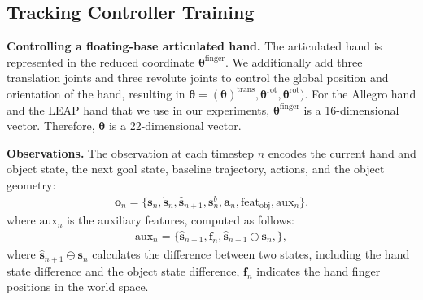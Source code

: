 \subsection{Tracking Controller Training} \label{sec:supp_method_tracking_controller_train}




\noindent\textbf{Controlling a floating-base articulated hand.} The articulated hand is represented in the reduced coordinate $\mathbf{\theta}^{\text{finger}}$. We additionally add three translation joints and three revolute joints to control the global position and orientation of the hand, resulting in $\mathbf{\theta} = (\mathbf{\theta})^{\text{trans}}, \mathbf{\theta}^{\text{rot}}, \mathbf{\theta}^{\text{rot}})$. For the Allegro hand and the LEAP hand that we use in our experiments, $\mathbf{\theta}^{\text{finger}}$  is a 16-dimensional vector. Therefore, $\mathbf{\theta}$ is a 22-dimensional vector. 



\noindent\textbf{Observations.} 
The observation at each timestep $n$ encodes the current hand and object state, the next goal state, baseline trajectory, actions, and the object geometry: 
\begin{align}
    \mathbf{o}_n = \{ \mathbf{s}_n, \dot{\mathbf{s}}_n,  \hat{\mathbf{s}}_{n+1}, \mathbf{s}^b_n, \mathbf{a}_n, \text{feat}_{\text{obj}}, \text{aux}_n \}. \label{eq_obs}
\end{align}
where $\text{aux}_n$ is the auxiliary features, computed as follows:
\begin{align}
    \text{aux}_n = \{ \hat{\mathbf{s}}_{n+1}, \mathbf{f}_n, \hat{\mathbf{s}}_{n+1} \ominus {\mathbf{s}}_n,    \}, \label{eq:observations_aux}
\end{align}
where $\hat{\mathbf{s}}_{n+1}\ominus {\mathbf{s}}_n$  calculates the difference between two states, including the hand state difference and the object state difference, $\mathbf{f}_n$ indicates the hand finger positions in the world space.





